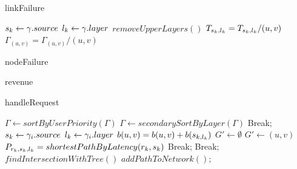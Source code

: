 \documentclass[a4paper, 10pt, conference]{ieeeconf}
\DeclarePairedDelimiter\abs{\lvert}{\rvert}%
\begin{document}
\begin{algorithm}
    \caption{linkFailure}\label{alg:linkFailure}
    \begin{algorithmic}[1]
            \State $s_k\gets\gamma.source$ 
            \State $l_k\gets\gamma.layer$
            \State $removeUpperLayers()$
            \State $T_{s_k,l_k} = T_{s_k,l_k} / (u,v)$ 
            \State $\Gamma_{(u,v)} = \Gamma_{(u,v)} / (u,v)$
        \EndFor
    \EndProcedure
    \end{algorithmic}
\end{algorithm}

\begin{algorithm}
    \caption{nodeFailure}\label{alg:nodeFailure}
    \begin{algorithmic}[1]
    \EndProcedure
    \end{algorithmic}
\end{algorithm}

\begin{algorithm}
    \caption{revenue}\label{alg:revenue}
    \begin{algorithmic}[1]
    \EndProcedure
    \end{algorithmic}
\end{algorithm}

\begin{algorithm}
    \caption{handleRequest}\label{alg:handleRequest}
    \begin{algorithmic}[1]
        \State $\Gamma \gets sortByUserPriority(\Gamma)$
        \State $\Gamma \gets secondarySortByLayer(\Gamma)$
            Break; 
            \EndIf
            \State $s_k\gets\gamma_i.source$ 
            \State $l_k\gets\gamma_i.layer$ 
                \State $b(u,v) = b(u,v) + b(s_{k,l_k})$
            \EndFor
            \State $G' \gets \emptyset$
                    \State $G' \gets (u,v) $
                \EndIf
            \EndFor
            \State $P_{r_k,s_k,l_k} = shortestPathByLatency(r_k ,s_k)$
             Break; \EndIf
             
                \State Break; 
                \EndIf
            \EndIf
            \State $findIntersectionWithTree()$
            \State $addPathToNetwork();$
        \EndFor
    \EndProcedure
    \end{algorithmic}
\end{algorithm}
\end{document}
